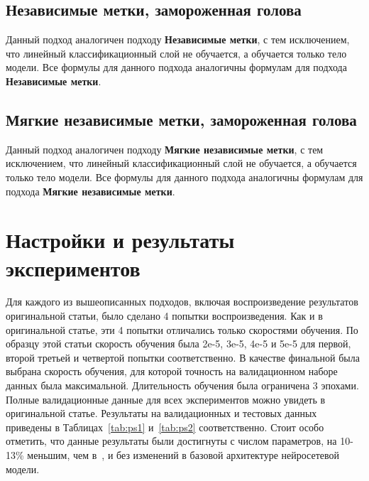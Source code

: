\subsection{Независимые метки, замороженная голова}\label{subch:pseudolabel/sect3/sub7}

Данный подход аналогичен подходу \textbf{Независимые метки}, с тем исключением, что линейный классификационный слой не обучается, а обучается только тело модели. Все формулы для данного подхода аналогичны формулам для подхода \textbf{Независимые метки}.

\subsection{Мягкие независимые метки, замороженная голова}\label{subch:pseudolabel/sect3/sub8}

Данный подход аналогичен подходу \textbf{Мягкие независимые метки}, с тем исключением, что линейный классификационный слой не обучается, а обучается только тело модели. Все формулы для данного подхода аналогичны формулам для подхода \textbf{Мягкие независимые метки}.
\section{Настройки и результаты экспериментов}\label{ch:pseudolabel/sect4}

Для каждого из вышеописанных подходов, включая воспроизведение результатов оригинальной статьи, было сделано 4 попытки воспроизведения. Как и в оригинальной статье, эти 4 попытки отличались только скоростями обучения. По образцу этой статьи скорость обучения была 2e-5, 3e-5, 4e-5 и 5e-5 для первой, второй третьей и четвертой попытки соответственно. В качестве финальной была выбрана скорость обучения, для которой точность на валидационном наборе данных была максимальной. Длительность обучения была ограничена 3 эпохами. Полные валидационные данные для всех экспериментов можно увидеть в оригинальной статье.
Результаты на валидационных и тестовых данных приведены в Таблицах~\ref{tab:ps1} и~\ref{tab:ps2} соответственно. Стоит особо отметить, что данные результаты были достигнуты с числом параметров, на 10-13\% меньшим, чем в~\cite{stickland_2019}, и без изменений в базовой архитектуре нейросетевой модели.

